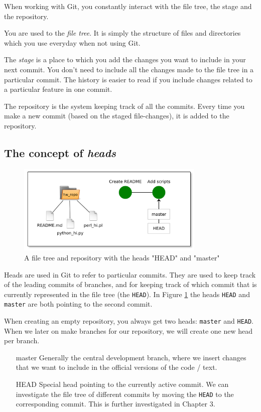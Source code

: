 \documentclass[../main/git_course_main.tex]{subfiles}
\begin{document}
When working with Git, you constantly interact with the file tree, the stage and the repository.

You are used to the \textit{file tree}. It is simply the structure of files and directories which you use everyday when not using Git.

The \textit{stage} is a place to which you add the changes you want to include in your next commit. You don't need to include all the changes made to the
file tree in a particular commit. The history is easier to read if you include changes related to a particular feature in one commit.

The repository is the system keeping track of all the commits. Every time you make a new commit (based on the staged file-changes), it is added to the repository.

\subsection{The concept of \textit{heads}}

\begin{figure}[h!]
	\centering
	\includegraphics[width=0.8\textwidth]{../visualizations/chapter2/c25_repo_second_commit.pdf}
	\caption{A file tree and repository with the heads "HEAD" and "master"}
	\label{fig:head_illustration}
\end{figure}

Heads are used in Git to refer to particular commits. They are used to keep track of the leading commits of branches, and for keeping track of which commit that is currently represented in the file tree (the \verb$HEAD$). In Figure \ref{fig:head_illustration} the heads \verb$HEAD$ and \verb$master$ are both pointing to the second commit.

When creating an empty repository, you always get two heads: \verb$master$ and \verb$HEAD$. When we later on make branches for our repository, we will create one new head per branch.

\begin{enumerate}
	\item[master] Generally the central development branch, where we insert changes that we want to include in the official versions of the code / text.
	\item[HEAD] Special head pointing to the currently active commit. We can investigate the file tree of different commits by moving the \verb$HEAD$ to the corresponding commit. This is further investigated in Chapter 3.
\end{enumerate}
\end{document}
